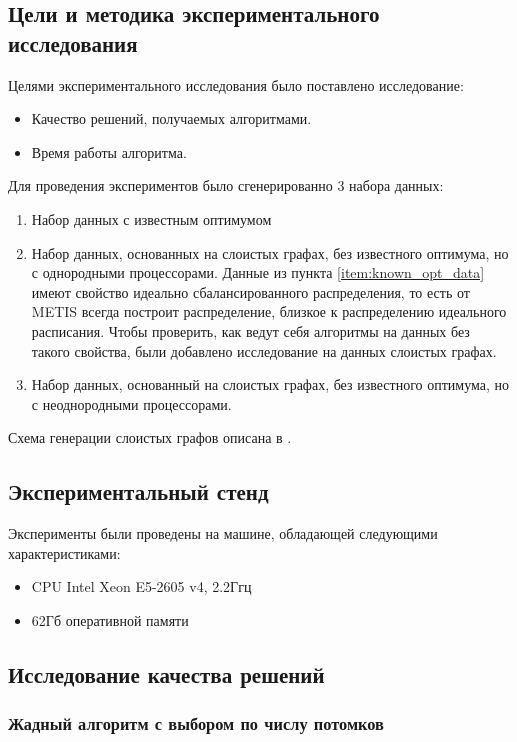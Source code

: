 \subsection{Цели и методика экспериментального исследования}
Целями экспериментального исследования было поставлено исследование:
\begin{itemize}
    \item Качество решений, получаемых алгоритмами.
    \item Время работы алгоритма.
\end{itemize}

Для проведения экспериментов было сгенерированно 3 набора данных:
\begin{enumerate}
    \item \label{item:known_opt_data} Набор данных с известным оптимумом
    \item Набор данных, основанных на слоистых графах, без известного оптимума, но с однородными процессорами. Данные из пункта \ref{item:known_opt_data} имеют свойство идеально сбалансированного распределения, то есть от METIS всегда построит распределение, близкое к распределению идеального расписания. Чтобы проверить, как ведут себя алгоритмы на данных без такого свойства, были добавлено исследование на данных слоистых графах. 
    \item Набор данных, основанный на слоистых графах, без известного оптимума, но с неоднородными процессорами.
\end{enumerate}

Схема генерации слоистых графов описана в \cite{Canon_2019}.

\subsection{Экспериментальный стенд}

Эксперименты были проведены на машине, обладающей следующими характеристиками:
\begin{itemize}
    \item CPU Intel Xeon E5-2605 v4, 2.2Ггц
    \item 62Гб оперативной памяти
\end{itemize}

\subsection{Исследование качества решений}

\subsubsection{Жадный алгоритм с выбором по числу потомков}

